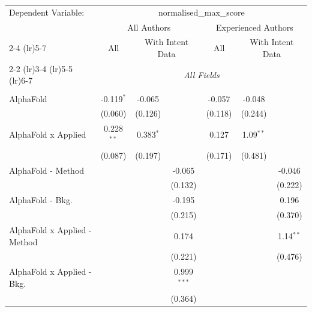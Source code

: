 \begingroup
\centering
\begin{tabular}{lcccccc}
   \tabularnewline \midrule \midrule
   Dependent Variable: & \multicolumn{6}{c}{normalised\_max\_score}\\
 & \multicolumn{3}{c}{All Authors} & \multicolumn{3}{c}{Experienced Authors} \\
\cmidrule(lr){2-4} \cmidrule(lr){5-7}
 & \multicolumn{1}{c}{All} & \multicolumn{2}{c}{With Intent Data} & \multicolumn{1}{c}{All} & \multicolumn{2}{c}{With Intent Data} \\
\cmidrule(lr){2-2} \cmidrule(lr){3-4} \cmidrule(lr){5-5} \cmidrule(lr){6-7}
 & \multicolumn{6}{c}{\textit{All Fields}} \\ \\
   AlphaFold                      & -0.119$^{*}$   & -0.065      &               & -0.057  & -0.048        &   \\   
                                  & (0.060)        & (0.126)     &               & (0.118) & (0.244)       &   \\   
   AlphaFold x Applied            & 0.228$^{**}$   & 0.383$^{*}$ &               & 0.127   & 1.09$^{**}$   &   \\   
                                  & (0.087)        & (0.197)     &               & (0.171) & (0.481)       &   \\   
   AlphaFold - Method             &                &             & -0.065        &         &               & -0.046\\   
                                  &                &             & (0.132)       &         &               & (0.222)\\   
   AlphaFold - Bkg.               &                &             & -0.195        &         &               & 0.196\\   
                                  &                &             & (0.215)       &         &               & (0.370)\\   
   AlphaFold x Applied - Method   &                &             & 0.174         &         &               & 1.14$^{**}$\\   
                                  &                &             & (0.221)       &         &               & (0.476)\\   
   AlphaFold x Applied - Bkg.     &                &             & 0.999$^{***}$ &         &               &   \\   
                                  &                &             & (0.364)       &         &               &   \\   

\end{tabular}
